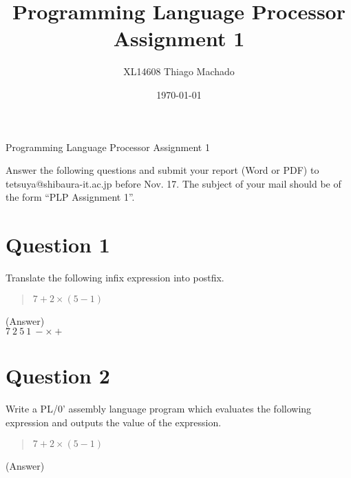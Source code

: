 \documentclass{article}
\title{Programming Language Processor \\ Assignment 1}
\author{XL14608 Thiago Machado}
\date{\today}
\begin{document}
\ifreport
\maketitle
\else
\begin{center}
{\huge Programming Language Processor Assignment 1}
\end{center}
Answer the following questions and submit your report (Word or PDF) to
tetsuya@shibaura-it.ac.jp before Nov. 17. 
The subject of your mail should be of the form ``PLP Assignment 1''.
\fi


\section*{Question 1}
Translate the following infix expression into postfix.
\begin{quote}
 $7 + 2 \times (5 - 1)$
\end{quote}

\ifreport
(Answer)\\
\fi
$7\ 2\ 5\ 1\ - \times +$



\section*{Question 2}
Write a PL/0' assembly language program which evaluates the following
expression and outputs the value of the expression.
\begin{quote}
 $7 + 2 \times (5 - 1)$
\end{quote}

\ifreport
(Answer)\\
\fi





\end{document}
